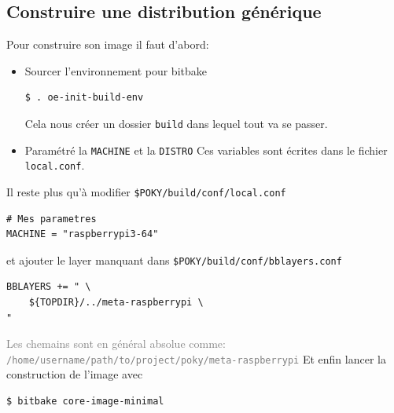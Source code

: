 \documentclass[compress]{smilebeamer}
\begin{document}
\subsection{Construire une distribution générique}
\begin{frame}[fragile]
Pour construire son image il faut d'abord:
\begin{itemize}
	\item Sourcer l'environnement pour bitbake
		\begin{lstlisting}[style=shell]
$ . oe-init-build-env
		\end{lstlisting}
		Cela nous créer un dossier \texttt{build} dans lequel tout va se passer.
	\item Paramétré la \texttt{MACHINE} et la \texttt{DISTRO}\newline
		Ces variables sont écrites dans le fichier \texttt{local.conf}.
\end{itemize}
\end{frame}

\begin{frame}[fragile]
Il reste plus qu'à modifier \texttt{\$POKY/build/conf/local.conf}
\begin{lstlisting}[style=bitbake]
# Mes parametres
MACHINE = "raspberrypi3-64"
\end{lstlisting}
et ajouter le layer manquant dans \texttt{\$POKY/build/conf/bblayers.conf}
\begin{lstlisting}[style=bitbake]
BBLAYERS += " \
    ${TOPDIR}/../meta-raspberrypi \
"
\end{lstlisting}
\textcolor{gray}{\tiny{Les chemains sont en général absolue comme: \texttt{/home/username/path/to/project/poky/meta-raspberrypi}}}\newline
Et enfin lancer la construction de l'image avec
\begin{lstlisting}[style=shell]
$ bitbake core-image-minimal
\end{lstlisting}
\end{frame}
\end{document}
